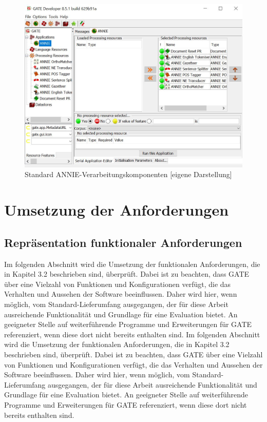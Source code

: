 \documentclass[12pt]{report}
\begin{document}
\begin{figure}[h!]
\begin{center}
\includegraphics[scale=0.65]{GATE_Bilder/ANNIE2.jpg}
\caption{Standard ANNIE-Verarbeitungskomponenten [eigene Darstellung]}
\end{center}
\end{figure}


\section{Umsetzung der Anforderungen}

\subsection{Repräsentation funktionaler Anforderungen}
Im folgenden Abschnitt wird die Umsetzung der funktionalen Anforderungen, die in Kapitel 3.2 beschrieben sind, überprüft. Dabei ist zu beachten, dass GATE über eine Vielzahl von Funktionen und Konfigurationen verfügt, die das Verhalten und Aussehen der Software beeinflussen. Daher wird hier, wenn möglich, vom Standard-Lieferumfang ausgegangen, der für diese Arbeit ausreichende Funktionalität und Grundlage für eine Evaluation bietet. An geeigneter Stelle auf weiterführende Programme und Erweiterungen für GATE referenziert, wenn diese dort nicht bereits enthalten sind.
Im folgenden Abschnitt wird die Umsetzung der funktionalen Anforderungen, die in Kapitel 3.2 beschrieben sind, überprüft. Dabei ist zu beachten, dass GATE über eine Vielzahl von Funktionen und Konfigurationen verfügt, die das Verhalten und Aussehen der Software beeinflussen. Daher wird hier, wenn möglich, vom Standard-Lieferumfang ausgegangen, der für diese Arbeit ausreichende Funktionalität und Grundlage für eine Evaluation bietet. An geeigneter Stelle auf weiterführende Programme und Erweiterungen für GATE referenziert, wenn diese dort nicht bereits enthalten sind.
\end{document}

